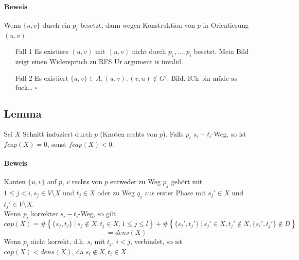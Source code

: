 \documentclass{article}
\newcommand{\set}[2]{\left\lbrace #1~|~#2 \right\rbrace}
\newcommand{\qed}{$\square$}
\begin{document}
\paragraph{Beweis}
Wenn $\{u,v\}$ durch ein $p_i$ besetzt, dann wegen Konstruktion von $p$ in Orientierung $(u,v)$.
\begin{enumerate}
	\item[Fall 1] Es existiere $(u,v)$ mit $(u,v)$ nicht durch $p_1, \ldots, p_i$ besetzt. Mein Bild zeigt einen Widerspruch zu RFS Ur argument is invalid.
	\item[Fall 2] Es existiert $\{u,v\} \in A, (u,v), (v,u) \notin G'$. Bild. ICh bin müde as fuck\ldots
	\qed
\end{enumerate}

\subsection{Lemma}
Sei $X$ Schnitt induziert durch $p$ (Knoten rechts von $p$). Falls $p_i$ $s_i-t_i$-Weg, so ist $fcap(X) = 0$, sonst $fcap(X) < 0$.
\paragraph{Beweis}
Kanten $\{u,v\}$ auf $p$, $v$ rechts von $p$ entweder zu Weg $p_j$ gehört mit $1 \leq j < i, s_j \in V\setminus X$ und $t_j\in X$ oder zu Weg $q_j$ aus erster Phase mit $s_j'\in X$ und $t_j' \in V\setminus X$.\\
Wenn $p_i$ korrekter $s_i-t_i$-Weg, so gilt
\[cap(X) = \# \set{\{s_j, t_j\}}{s_j \notin X, t_j \in X, 1 \leq j \leq l}
+\# \set{\{s_j', t_j'\}}{s_j' \in X, t_j' \notin X, \{s_i', t_j'\} \notin D } \]
\[ = dens(X)\]
Wenn $p_i$ nicht korrekt, d.h. $s_i$ mit $t_j$, $i< j$, verbindet, so ist $cap(X) < dens(X)$, da $s_i \notin X, t_i \in X$.
\qed
\end{document}
